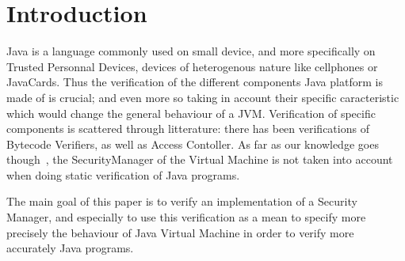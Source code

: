 \documentclass[draft]{llncs}
\begin{document}
\section{Introduction}
Java is a language commonly used on small device, and more specifically on Trusted Personnal Devices, devices
of heterogenous nature like cellphones or JavaCards. Thus the verification of the different components Java
platform is made of is crucial; and even more so taking in account their specific caracteristic which would
change the general behaviour of a JVM. Verification of specific components is scattered through litterature: 
there has been verifications of Bytecode Verifiers, as well as Access Contoller. As far as our knowledge goes
though~\cite{HartelMoreau01}, the SecurityManager of the Virtual Machine is not taken into account when
doing static verification of Java programs.


The main goal of this paper is to verify an implementation of a Security Manager, and especially to use 
this verification as a mean to specify more precisely the behaviour of Java Virtual Machine in order to
verify more accurately Java programs.
\end{document}
